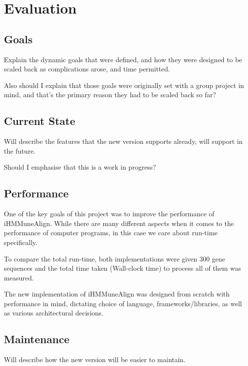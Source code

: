 \chapter{Evaluation}\label{ch:eval}

\section{Goals}
Explain the dynamic goals that were defined, and how they were designed to be scaled back as complications arose, and time permitted. 

Also should I explain that those goals were originally set with a group project in mind, and that's the primary reason they had to be scaled back so far?

\section{Current State}
Will describe the features that the new version supports already, will support in the future.

Should I emphasise that this is a work in progress?

\section{Performance}
One of the key goals of this project was to improve the performance of iHMMuneAlign. While there are many different aspects when it comes to the performance of computer programs, in this case we care about run-time specifically. 

To compare the total run-time, both implementations were given 300 gene sequences and the total time taken (Wall-clock time) to process all of them was measured. 

\begin{figure}
\end{figure}


The new implementation of iHMMuneAlign was designed from scratch with performance in mind, dictating choice of language, frameworks/libraries, as well as various architectural decisions. 

\section{Maintenance}
Will describe how the new version will be easier to maintain.